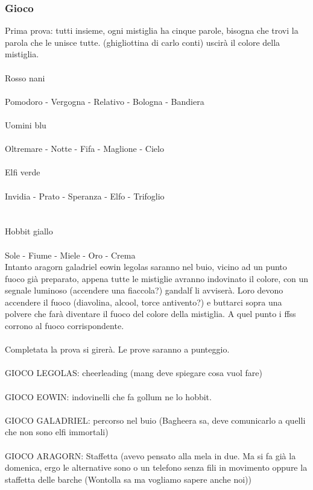 \documentclass[../main.tex]{subfiles}
\begin{document}
        \subsubsection{Gioco}
        Prima prova: tutti insieme, ogni mistiglia ha cinque parole, bisogna che trovi la parola che le unisce tutte. (ghigliottina di carlo conti) uscirà il colore della mistiglia.\\
        \\
        Rosso nani\\
\\
Pomodoro - Vergogna - Relativo - Bologna - Bandiera 
\\
\\
Uomini blu\\
\\
Oltremare - Notte - Fifa - Maglione - Cielo
\\
\\
Elfi verde\\
\\
Invidia - Prato - Speranza - Elfo - Trifoglio\\
\\
\\
Hobbit giallo\\
\\
Sole - Fiume - Miele - Oro - Crema
\\
Intanto aragorn galadriel eowin legolas saranno nel buio, vicino ad un punto fuoco già preparato, appena tutte le mistiglie avranno indovinato il colore, con un segnale luminoso (accendere una fiaccola?) gandalf li avviserà. Loro devono accendere il fuoco (diavolina, alcool, torce antivento?) e buttarci sopra una polvere che farà diventare il fuoco del colore della mistiglia. A quel punto i ffss corrono al fuoco corrispondente.\\
\\
Completata la prova si girerà. Le prove saranno a punteggio.\\
\\
GIOCO LEGOLAS: cheerleading (mang deve spiegare cosa vuol fare)\\
\\
GIOCO EOWIN: indovinelli che fa gollum ne lo hobbit.\\
\\
GIOCO GALADRIEL: percorso nel buio (Bagheera sa, deve comunicarlo a quelli che non sono elfi immortali)\\
\\
GIOCO ARAGORN: Staffetta (avevo pensato alla mela in due. Ma si fa già la domenica, ergo le alternative sono o un telefono senza fili in movimento oppure la staffetta delle barche (Wontolla sa ma vogliamo sapere anche noi))
\end{document}
